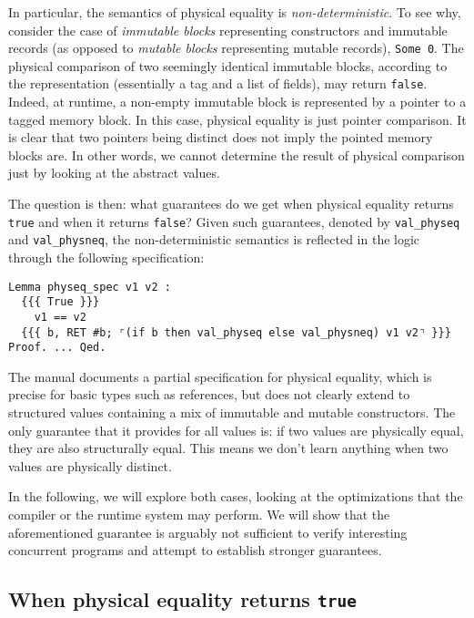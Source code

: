 In particular, the semantics of physical equality is \emph{non-deterministic}.
To see why, consider the case of \emph{immutable blocks} representing constructors and immutable records (as opposed to \emph{mutable blocks} representing mutable records), \eg \texttt{Some 0}.
The physical comparison of two seemingly identical immutable blocks, according to the \Rocq representation (essentially a tag and a list of fields), may return \texttt{false}.
Indeed, at runtime, a non-empty immutable block is represented by a pointer to a tagged memory block.
In this case, physical equality is just pointer comparison.
It is clear that two pointers being distinct does not imply the pointed memory blocks are.
In other words, we cannot determine the result of physical comparison just by looking at the abstract values.

The question is then: what guarantees do we get when physical equality returns \texttt{true} and when it returns \texttt{false}?
Given such guarantees, denoted by \texttt{val_physeq} and \texttt{val_physneq}, the non-deterministic semantics is reflected in the logic through the following specification:

\begin{verbatim}
Lemma physeq_spec v1 v2 :
  {{{ True }}}
    v1 == v2
  {{{ b, RET #b; ⌜(if b then val_physeq else val_physneq) v1 v2⌝ }}}
Proof. ... Qed.
\end{verbatim}

The \OCaml manual documents a partial specification for physical equality, which is precise for basic types such as references, but does not clearly extend to structured values containing a mix of immutable and mutable constructors.
The only guarantee that it provides for all values is: if two values are physically equal, they are also structurally equal.
This means we don't learn anything when two values are physically distinct.

In the following, we will explore both cases, looking at the optimizations that the compiler or the runtime system may perform.
We will show that the aforementioned guarantee is arguably not sufficient to verify interesting concurrent programs and attempt to establish stronger guarantees.

\subsection{When physical equality returns \texttt{true}}

